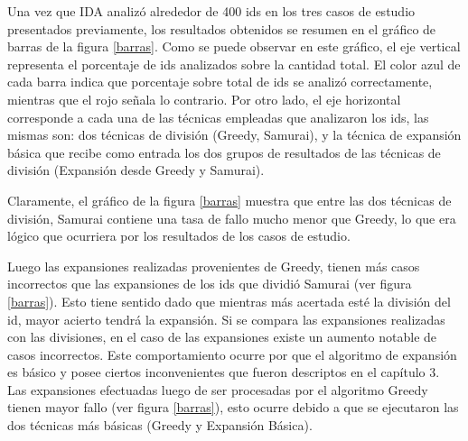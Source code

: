 Una vez que IDA analizó alrededor de 400 ids en los tres casos de estudio presentados previamente, los resultados obtenidos se resumen en el gráfico de barras de la figura \ref{barras}. Como se puede observar en este gráfico, el eje vertical representa el porcentaje de ids analizados sobre la cantidad total. El color azul de cada barra indica que porcentaje sobre total de ids se analizó correctamente, mientras que el rojo señala lo contrario. Por otro lado, el eje horizontal corresponde a cada una de las técnicas empleadas que analizaron los ids, las mismas son: dos técnicas de división (Greedy, Samurai), y la técnica de expansión básica que recibe como entrada los dos grupos de resultados de las técnicas de división (Expansión desde Greedy y Samurai).

Claramente, el gráfico de la figura \ref{barras} muestra que entre las dos técnicas de división, Samurai contiene una tasa de fallo mucho menor que Greedy, lo que era lógico que ocurriera por los resultados de los casos de estudio.

Luego las expansiones realizadas provenientes de Greedy, tienen más casos incorrectos que las expansiones de los ids que dividió Samurai (ver figura \ref{barras}). Esto tiene sentido dado que mientras más acertada esté la división del id, mayor acierto tendrá la expansión. Si se compara las expansiones realizadas con las divisiones, en el caso de las expansiones existe un aumento notable de casos incorrectos. Este comportamiento ocurre por que el algoritmo de expansión es básico y posee ciertos inconvenientes que fueron descriptos en el capítulo 3. Las expansiones efectuadas luego de ser procesadas por el algoritmo Greedy tienen mayor fallo (ver figura \ref{barras}), esto ocurre debido a que se ejecutaron las dos técnicas más básicas (Greedy y Expansión Básica).
